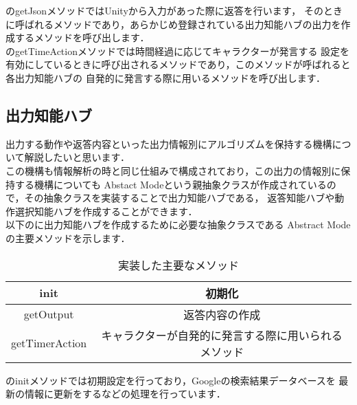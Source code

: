 のgetJsonメソッドではUnityから入力があった際に返答を行います，
そのときに呼ばれるメソッドであり，あらかじめ登録されている出力知能ハブの出力を作成するメソッドを呼び出します．\\

のgetTimeActionメソッドでは時間経過に応じてキャラクターが発言する
設定を有効にしているときに呼び出されるメソッドであり，このメソッドが呼ばれると各出力知能ハブの
自発的に発言する際に用いるメソッドを呼び出します．\\



\subsection{出力知能ハブ}
出力する動作や返答内容といった出力情報別にアルゴリズムを保持する機構について解説したいと思います．\\

この機構も情報解析の時と同じ仕組みで構成されており，この出力の情報別に保持する機構についても
Abstact Modeという親抽象クラスが作成されているので，その抽象クラスを実装することで出力知能ハブである，
返答知能ハブや動作選択知能ハブを作成することができます．
\\
以下のに出力知能ハブを作成するために必要な抽象クラスである
Abstract Modeの主要メソッドを示します．\\

\begin{table}[tbh]
	\caption{実装した主要なメソッド} \label{tab:abstractmode}
	\begin{center}
		\begin{tabular}[htb]{c|c}
		\hline
		init & 初期化 \\
		\hline
		getOutput & 返答内容の作成 \\
		\hline
		getTimerAction & キャラクターが自発的に発言する際に用いられるメソッド \\
		\hline
		\end{tabular}
	\end{center}
\end{table}

のinitメソッドでは初期設定を行っており，Googleの検索結果データベースを
最新の情報に更新をするなどの処理を行っています．\\


